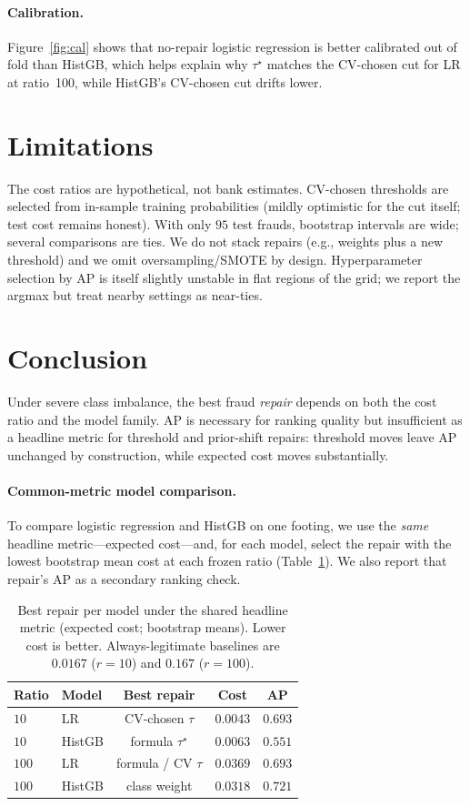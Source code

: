\documentclass[10pt,twocolumn,letterpaper]{article}
\begin{document}
\paragraph{Calibration.}
Figure~\ref{fig:cal} shows that no-repair logistic regression is better calibrated out of fold than HistGB, which helps explain why $\tau^{\star}$ matches the CV-chosen cut for LR at ratio~100, while HistGB's CV-chosen cut drifts lower.

\section{Limitations}
The cost ratios are hypothetical, not bank estimates.
CV-chosen thresholds are selected from in-sample training probabilities (mildly optimistic for the cut itself; test cost remains honest).
With only $95$ test frauds, bootstrap intervals are wide; several comparisons are ties.
We do not stack repairs (e.g., weights plus a new threshold) and we omit oversampling/SMOTE by design.
Hyperparameter selection by AP is itself slightly unstable in flat regions of the grid; we report the argmax but treat nearby settings as near-ties.

\section{Conclusion}
Under severe class imbalance, the best fraud \emph{repair} depends on both the cost ratio and the model family.
AP is necessary for ranking quality but insufficient as a headline metric for threshold and prior-shift repairs: threshold moves leave AP unchanged by construction, while expected cost moves substantially.

\paragraph{Common-metric model comparison.}
To compare logistic regression and HistGB on one footing, we use the \emph{same} headline metric---expected cost---and, for each model, select the repair with the lowest bootstrap mean cost at each frozen ratio (Table~\ref{tab:compare}).
We also report that repair's AP as a secondary ranking check.

\begin{table}[t]
\centering
\caption{Best repair per model under the shared headline metric (expected cost; bootstrap means). Lower cost is better. Always-legitimate baselines are $0.0167$ ($r{=}10$) and $0.167$ ($r{=}100$).}
\label{tab:compare}
\setlength{\tabcolsep}{3.5pt}
\begin{tabular}{llccc}
\toprule
Ratio & Model & Best repair & Cost & AP \\
\midrule
$10$ & LR & CV-chosen $\tau$ & $\mathbf{0.0043}$ & $0.693$ \\
$10$ & HistGB & formula $\tau^{\star}$ & $0.0063$ & $0.551$ \\
\midrule
$100$ & LR & formula / CV $\tau$ & $0.0369$ & $0.693$ \\
$100$ & HistGB & class weight & $\mathbf{0.0318}$ & $0.721$ \\
\bottomrule
\end{tabular}
\end{table}
\end{document}
